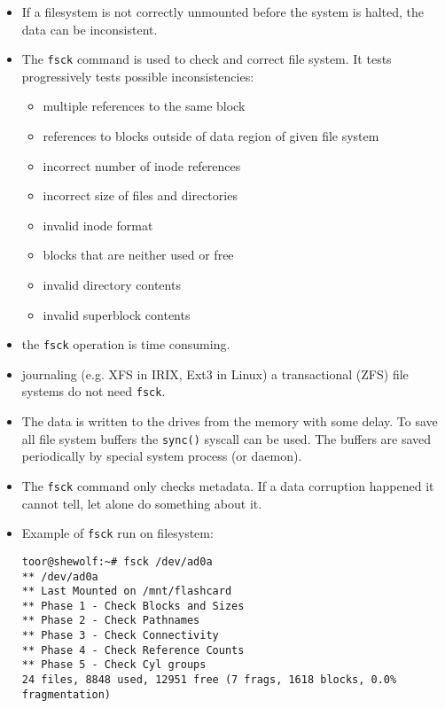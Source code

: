 \begin{slide}
\setlength{\baselineskip}{0.8\baselineskip}
\begin{itemize}
\setlength{\itemsep}{0ex}
\item If a filesystem is not correctly unmounted before the system is halted,
the data can be inconsistent.
\item The \texttt{fsck} command is used to check and correct file system.
It tests progressively tests possible inconsistencies:
    \begin{itemize}
    \setlength{\itemsep}{0ex}
    \item multiple references to the same block
    \item references to blocks outside of data region of given file system
    \item incorrect number of inode references
    \item incorrect size of files and directories
    \item invalid inode format
    \item blocks that are neither used or free
    \item invalid directory contents
    \item invalid superblock contents
    \end{itemize}
\item the \texttt{fsck} operation is time consuming.
\item journaling (e.g. XFS in IRIX, Ext3 in Linux) a transactional (ZFS)
file systems do not need \texttt{fsck}.
\end{itemize}
\end{slide}

\begin{itemize}
\item The data is written to the drives from the memory with some delay.
To save all file system buffers the \texttt{sync()} syscall can be used.
The buffers are saved periodically by special system process (or daemon).
\item The \texttt{fsck} command only checks metadata. If a data corruption
happened it cannot tell, let alone do something about it.
\item Example of \texttt{fsck} run on  filesystem:
\begin{verbatim}
toor@shewolf:~# fsck /dev/ad0a
** /dev/ad0a
** Last Mounted on /mnt/flashcard
** Phase 1 - Check Blocks and Sizes
** Phase 2 - Check Pathnames
** Phase 3 - Check Connectivity
** Phase 4 - Check Reference Counts
** Phase 5 - Check Cyl groups
24 files, 8848 used, 12951 free (7 frags, 1618 blocks, 0.0% fragmentation)
\end{verbatim}
\end{itemize}


